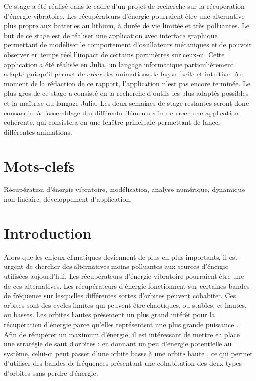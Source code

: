 \documentclass[a4paper, french, 12pt, titlepage]{article}
\begin{document}
Ce stage a été réalisé dans le cadre d'un projet de recherche sur la récupération d'énergie vibratoire.
Les récupérateurs d'énergie pourraient être une alternative plus propre aux batteries au lithium, à durée de vie limitée et très polluantes. Le but de ce stage est de réaliser une application avec interface graphique permettant de modéliser le comportement d'oscillateurs mécaniques et de pouvoir observer en temps réel l'impact de certains paramètres sur ceux-ci.
Cette application a été réalisée en Julia, un langage informatique particulièrement adapté puisqu'il permet de créer des animations de façon facile et intuitive. Au moment de la rédaction de ce rapport, l'application n'est pas encore terminée.
Le plus gros de ce stage a consisté en la recherche d'outils les plus adaptés possibles et la maîtrise du langage Julia. Les deux semaines de stage restantes seront donc consacrées à l'assemblage des différents éléments afin de créer une application cohérente, qui consistera en une fenêtre principale permettant de lancer différentes animations.



\section*{Mots-clefs}

Récupération d'énergie vibratoire, modélisation, analyse numérique, dynamique non-linéaire, développement d'application.

\newpage

\tableofcontents

\newpage



\section{Introduction}



Alors que les enjeux climatiques deviennent de plus en plus importants, il est urgent de chercher des alternatives moins polluantes aux sources d'énergie utilisées aujourd'hui.
Les récupérateurs d'énergie vibratoire pourraient être une de ces alternatives.
Les récupérateurs d'énergie fonctionnent sur certaines bandes de fréquence sur lesquelles différentes sortes d'orbites peuvent cohabiter.
Ces orbites sont des cycles limites qui peuvent être chaotiques, ou stables, et hautes, ou basses.
Les orbites hautes présentent un plus grand intérêt pour la récupération d'énergie parce qu'elles représentent une plus grande puissance \cite{saint2022power}.
Afin de récupérer un maximum d'énergie, il est intéressant de mettre en place une stratégie de saut d'orbites : en donnant un peu d'énergie potentielle au système, celui-ci peut passer d'une orbite basse à une orbite haute \cite{huguet2018phd}, ce qui permet d'utiliser des bandes de fréquences présentant une cohabitation des deux types d'orbites sans perdre d'énergie.
\end{document}
